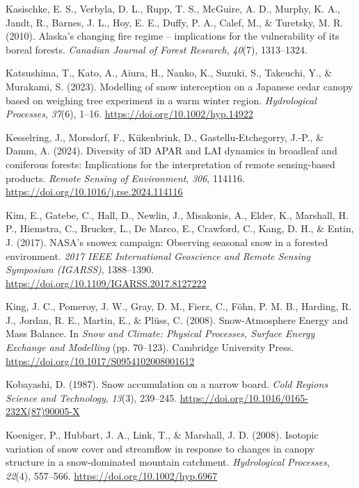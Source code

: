 \documentclass[
  letterpaper,
]{tex/uofsthesis-cs}
\newlength{\cslhangindent}
\newenvironment{CSLReferences}[2] %
 {\begin{list}{}{%
  \setlength{\itemindent}{0pt}
  \setlength{\leftmargin}{0pt}
  \setlength{\parsep}{0pt}
  \ifodd #1
   \setlength{\leftmargin}{\cslhangindent}
   \setlength{\itemindent}{-1\cslhangindent}
  \fi
  \setlength{\itemsep}{#2\baselineskip}}}
 {\end{list}}
\begin{document}
\begin{CSLReferences}{1}{0}
Kasischke, E. S., Verbyla, D. L., Rupp, T. S., McGuire, A. D., Murphy,
K. A., Jandt, R., Barnes, J. L., Hoy, E. E., Duffy, P. A., Calef, M., \&
Turetsky, M. R. (2010). Alaska's changing fire regime -- implications
for the vulnerability of its boreal forests. \emph{Canadian Journal of
Forest Research}, \emph{40}(7), 1313--1324.

Katsushima, T., Kato, A., Aiura, H., Nanko, K., Suzuki, S., Takeuchi,
Y., \& Murakami, S. (2023). Modelling of snow interception on a
{Japanese} cedar canopy based on weighing tree experiment in a warm
winter region. \emph{Hydrological Processes}, \emph{37}(6), 1--16.
\url{https://doi.org/10.1002/hyp.14922}

Kesselring, J., Morsdorf, F., Kükenbrink, D., Gastellu-Etchegorry,
J.-P., \& Damm, A. (2024). Diversity of {3D APAR} and {LAI} dynamics in
broadleaf and coniferous forests: {Implications} for the interpretation
of remote sensing-based products. \emph{Remote Sensing of Environment},
\emph{306}, 114116. \url{https://doi.org/10.1016/j.rse.2024.114116}

Kim, E., Gatebe, C., Hall, D., Newlin, J., Misakonis, A., Elder, K.,
Marshall, H. P., Hiemstra, C., Brucker, L., De Marco, E., Crawford, C.,
Kang, D. H., \& Entin, J. (2017). {NASA}'s snowex campaign: {Observing}
seasonal snow in a forested environment. \emph{2017 {IEEE} International
Geoscience and Remote Sensing Symposium ({IGARSS})}, 1388--1390.
\url{https://doi.org/10.1109/IGARSS.2017.8127222}

King, J. C., Pomeroy, J. W., Gray, D. M., Fierz, C., Föhn, P. M. B.,
Harding, R. J., Jordan, R. E., Martin, E., \& Plüss, C. (2008).
Snow-{Atmosphere Energy} and {Mass Balance}. In \emph{Snow and
{Climate}: {Physical Processes}, {Surface Energy Exchange} and
{Modelling}} (pp. 70--123). Cambridge University Press.
\url{https://doi.org/10.1017/S0954102008001612}

Kobayashi, D. (1987). Snow accumulation on a narrow board. \emph{Cold
Regions Science and Technology}, \emph{13}(3), 239--245.
\url{https://doi.org/10.1016/0165-232X(87)90005-X}

Koeniger, P., Hubbart, J. A., Link, T., \& Marshall, J. D. (2008).
Isotopic variation of snow cover and streamflow in response to changes
in canopy structure in a snow-dominated mountain catchment.
\emph{Hydrological Processes}, \emph{22}(4), 557--566.
\url{https://doi.org/10.1002/hyp.6967}


\end{CSLReferences}
\end{document}
